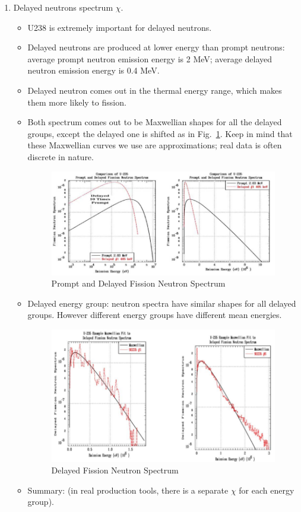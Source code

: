 \documentclass{school-22.211-notes}
\begin{document}
\begin{enumerate}
\item Delayed neutrons spectrum $\chi$.
  \begin{itemize}
  \item U238 is extremely important for delayed neutrons.
  \item Delayed neutrons are produced at lower energy than prompt neutrons: average prompt neutron emission energy is 2 MeV; average delayed neutron emission energy is 0.4 MeV. 
  \item Delayed neutron comes out in the thermal energy range, which makes them more likely to fission. 
  \item Both spectrum comes out to be Maxwellian shapes for all the delayed groups, except the delayed one is shifted as in Fig.~\ref{fission-spec}. Keep in mind that these Maxwellian curves we use are approximations; real data is often discrete in nature. 
    \begin{figure}[ht]
      \centering
      \includegraphics[width=4in]{images/pke/fission-spec.png}
      \caption{Prompt and Delayed Fission Neutron Spectrum} \label{fission-spec}
    \end{figure}
  \item Delayed energy group: neutron spectra have similar shapes for all delayed groups. However different energy groups have different mean energies. 
    \begin{figure}[ht]
      \centering
      \includegraphics[width=4in]{images/pke/delayed-fission-spec.png}
      \caption{Delayed Fission Neutron Spectrum} \label{delayed-fission-spec} 
    \end{figure}
  \item Summary:  (in real production tools, there is a separate $\chi$ for each energy group). 
  \end{itemize}
\end{enumerate}
\end{document}

